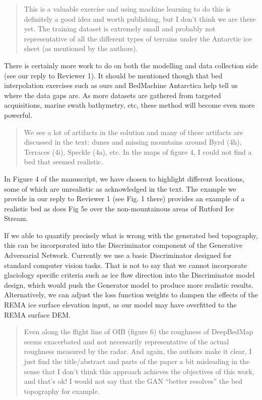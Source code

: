 \begin{quote}
\color{blue}
  This is a valuable exercise and using machine learning to do this is definitely a good idea and worth publishing, but I don’t think we are there yet.
  The training dataset is extremely small and probably not representative of all the different types of terrains under the Antarctic ice sheet (as mentioned by the authors).
\end{quote}

There is certainly more work to do on both the modelling and data collection side (see our reply to Reviewer 1).
It should be mentioned though that bed interpolation exercises such as ours and BedMachine Antarctica help tell us where the data gaps are.
As more datasets are gathered from targeted acquisitions, marine swath bathymetry, etc, these method will become even more powerful.

\begin{quote}
\color{blue}
  We see a lot of artifacts in the solution and many of these artifacts are discussed in the text: dunes and missing mountains around Byrd (4h), Terraces (4i), Speckle (4a), etc.
  In the maps of figure 4, I could not find a bed that seemed realistic.
\end{quote}

In Figure 4 of the manuscript, we have chosen to highlight different locations, some of which are unrealistic as acknowledged in the text.
The example we provide in our reply to Reviewer 1 (see Fig. 1 there) provides an example of a realistic bed as does Fig 5e over the non-mountainous areas of Rutford Ice Stream.

If we able to quantify precisely what is wrong with the generated bed topography, this can be incorporated into the Discriminator component of the Generative Adversarial Network.
Currently we use a basic Discriminator designed for standard computer vision tasks.
That is not to say that we cannot incorporate glaciology specific criteria such as ice flow direction into the Discriminator model design, which would push the Generator model to produce more realistic results.
Alternatively, we can adjust the loss function weights to dampen the effects of the REMA ice surface elevation input, as our model may have overfitted to the REMA surface DEM.

\begin{quote}
\color{blue}
  Even along the flight line of OIB (figure 6) the roughness of DeepBedMap seems exacerbated and not necessarily representative of the actual roughness measured by the radar.
  And again, the authors make it clear, I just find the title/abstract and parts of the paper a bit misleading in the sense that I don’t think this approach achieves the objectives of this work, and that’s ok!
  I would not say that the GAN “better resolves” the bed topography for example.
\end{quote}

